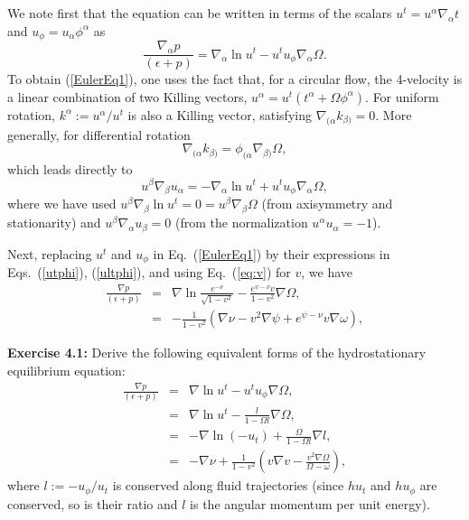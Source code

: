 \documentclass[12pt]{article}
\def\a{\alpha}
\def\be{\begin{equation}}
\def\ee{\end{equation}}
\newcommand{\na}{\nabla}
\def\a{\alpha}
\newcommand{\bsube}{\begin{subequations}}
\newcommand{\esube}{\end{subequations}}
\begin{document}
We note first that the equation can be written in terms of the scalars 
\mbox{$u^t = u^\a\na_\a t$} and $u_\phi = u_\a \phi^\a$ as 
\be
\frac{\nabla_\a  p}{(\epsilon+p)} = \nabla_\a \ln u^t 
 -u^tu_\phi\nabla_\a \Omega. \label{EulerEq1}
\ee
To obtain (\ref{EulerEq1}), one uses the fact that, for a circular flow, 
the 4-velocity is a linear combination of two Killing vectors, 
$u^\alpha = u^t(t^\alpha+\Omega \phi^\alpha)$.
For uniform rotation, $k^\alpha := u^\alpha/u^t$ is also a Killing
vector, satisfying $\nabla_{(\alpha} k_{\beta)}=0$. More generally, for differential 
rotation
\be
\nabla_{(\alpha} k_{\beta )} = \phi_{(\alpha} \nabla_{\beta )} \Omega,
\ee
which leads directly to 
\be
u^\beta \nabla_\beta u_\a = -\nabla_\a \ln u^t +u^tu_\phi\nabla_\a \Omega,
\label{ugradu}\ee
where we have used $u^\beta \nabla_\beta \ln u^t=0=u^\beta \nabla_\beta\Omega$ 
(from axisymmetry and stationarity) and $u^\beta \nabla_\alpha u_\beta =0$ 
(from the normalization $u^\alpha u_\alpha =-1$). 

Next, replacing $u^t$ and $u_\phi$ in Eq.~(\ref{EulerEq1}) by their expressions in 
Eqs.~(\ref{utphi}), (\ref{ultphi}), and using Eq.~(\ref{eq:v}) for $v$, we have 
\begin{eqnarray}
\frac{\nabla  p}{(\epsilon+p)} 
&=& \nabla \ln \frac{e^{-\nu}}{\sqrt{1-v^2}} -\frac{e^{\psi-\nu}v}{1-v^2}\nabla \Omega, 
\nonumber\\
&=& -\frac1{1-v^2} \left(\nabla\nu
         -v^2\nabla\psi +e^{\psi-\nu} v \nabla\omega\right), \label{EulerEq5}
\end{eqnarray}

\vskip0.5cm
\textbf{Exercise 4.1:}
Derive the following equivalent forms of the hydrostationary equilibrium equation: 
\bsube
\begin{eqnarray}
\frac{\nabla  p}{(\epsilon+p)} &=& \nabla \ln u^t - u^t u_\phi \nabla \Omega, 
\label{eq:EulerEq1a}\\
&=&  \nabla \ln u^t - \frac{l}{1-\Omega l} \nabla \Omega, \\
&=& -\nabla \ln (-u_t) + \frac{\Omega}{1-\Omega l} \nabla l, \\
&=& -\nabla \nu + \frac{1}{1-v^2} \left( v \nabla v - \frac{v^2\nabla \Omega}
{\Omega-\omega} \right), 
\end{eqnarray}\label{EulerEqAlt}\esube
where $l:=-u_\phi/u_t$ is conserved along fluid trajectories (since $h u_t$
and $h u_\phi$ are conserved, so is their ratio and $l$ is the angular
momentum per unit energy). 
\vskip0.5cm
\end{document}
